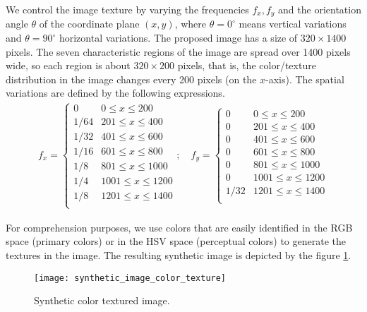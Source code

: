 We control the image texture by varying the frequencies $f_{x}, f_{y}$ and the orientation angle $\theta$ of the coordinate plane $(x, y)$, where $\theta=0^\circ$ means vertical variations and $\theta=90^\circ$ horizontal variations. The proposed image has a size of $320\times1400$ pixels. The seven characteristic regions of the image are spread over 1400 pixels wide, so each region is about $320\times200$ pixels, that is, the color/texture distribution in the image changes every 200 pixels (on the $x$-axis). The spatial variations are defined by the following expressions. 
\begin{gather}
	f_{x} = 
	\begin{cases} 
      0    & 0\leq x\leq 200  \\
      1/64 & 201\leq x\leq 400  \\
      1/32 & 401\leq x\leq 600  \\
      1/16 & 601\leq x\leq 800  \\
      1/8  & 801\leq x\leq 1000  \\
      1/4  & 1001\leq x\leq 1200 \\   
      1/8  & 1201\leq x\leq 1400 \\ 
   	 \end{cases} \nonumber ; \quad
   	 f_{y} = \begin{cases} 
      0    & 0\leq x\leq 200  \\
      0    & 201\leq x\leq 400  \\
      0    & 401\leq x\leq 600  \\
      0    & 601\leq x\leq 800  \\
      0    & 801\leq x\leq 1000  \\
      0    & 1001\leq x\leq 1200 \\  
      1/32 & 1201\leq x\leq 1400 \\ 
   	 \end{cases} \nonumber  
\end{gather}

For comprehension purposes, we use colors that are easily identified in the RGB space (primary colors) or in the HSV space (perceptual colors) to generate the textures in the image. The resulting synthetic image is depicted by the figure \ref{fig:synthetic_color_texture_image}.

\begin{figure}[!ht]
    \texttt{[image: synthetic\_image\_color\_texture]}
\caption{Synthetic color textured image.}\label{fig:synthetic_color_texture_image}
\end{figure}

